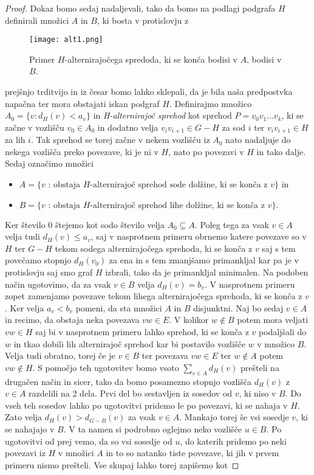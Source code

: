 \documentclass[12pt,a4paper,twoside]{article}
\theoremstyle{definition} %
\theoremstyle{plain} %
\numberwithin{equation}{section}  %
\begin{document}
\begin{proof}
Dokaz bomo sedaj nadaljevali, tako da bomo na podlagi podgrafa $H$ definirali množici $A$ in $B$, ki bosta v protislovju z  \begin{figure}[h!]
\caption{Primer $H$-alternirajočega spredoda, ki se konča bodisi v $A$, bodisi v $B$.}
\label{im1}
\centering
    \texttt{[image: alt1.png]}
    \end{figure}prejšnjo trditvijo in iz česar bomo lahko sklepali, da je bila naša predpostvka napačna ter mora obstajati iskan podgraf $H$. 
Definirajmo množico $A_0 = \{v : d_H(v) < a_v\}$ in \textit{H-alternirajoč sprehod} kot sprehod $P = v_0v_1\ldots v_k$, ki se začne v vozlišču $v_0 \in A_0$ in dodatno velja $v_iv_{i+1} \in G-H$ za sod $i$ ter $v_iv_{i+1} \in H$ za lih $i$. Tak sprehod se torej začne v nekem vozlišču iz $A_0$ nato nadaljuje do nekega vozlišča preko povezave, ki je ni v $H$, nato po povezavi v $H$ in tako dalje. Sedaj označimo množici
\begin{itemize}
\item $A = \{v \text{ : obstaja $H$-alternirajoč sprehod sode dolžine, ki se konča z $v$}\}$ in
\item $B =\{v \text{ : obstaja $H$-alternirajoč sprehod lihe dolžine, ki se konča z $v$}\}.$
\end{itemize}
Ker število $0$ štejemo kot sodo število velja $A_0 \subseteq A$. Poleg tega za vsak $v \in A$ velja tudi $d_H(v) \le a_v$, saj v nasprotnem primeru obrnemo katere povezave so v $H$ ter $G-H$ tekom sodega alternirajočega sprehoda, ki se konča z $v$ saj s tem povečamo stopnjo $d_H(v_0)$ za ena in s tem zmanjšamo primankljal kar pa je v protislovju saj smo graf $H$ izbrali, tako da je primankljal minimalen. Na podoben način ugotovimo, da za vsak $v \in B$ velja $d_H(v) = b_v$. V nasprotnem primeru zopet zamenjamo povezave tekom lihega alternirajočega sprehoda, ki se konča z $v$. Ker velja $a_v < b_v$ pomeni, da sta množici $A$ in $B$ disjunktni. Naj bo sedaj $v \in A$ in recimo, da obstaja neka povezava $vw \in E$. V kolikor $w \notin B$ potem mora veljati $vw \in H$ saj bi v nasprotnem primeru lahko sprehod, ki se konča z $v$ podaljšali do $w$ in tkao dobili lih alternirajoč sprehod kar bi postavilo vozlišče $w$ v množico $B$. Velja tudi obratno, torej če je $v \in B$ ter povezava $vw \in  E$ ter $w \notin A$ potem $vw \notin H$. S pomočjo teh ugotovitev bomo vsoto $\sum_{v \in A} d_H(v)$ prešteli na drugačen način in sicer, tako da bomo posamezno stopnjo vozlišča $d_H(v)$ z $v \in  A$ razdelili na 2 dela. Prvi del bo sestavljen iz sosedov od $v$, ki niso v $B$. Do vseh teh sosedov lahko po ugotovitvi pridemo le po povezavi, ki se nahaja v $H$. Zato velja $d_H(v) > d_{G-B}(v)$ za vsak $v \in A$. Mankajo torej še vsi sosedje $v$, ki se nahajajo v $B$. V ta namen si podrobno oglejmo neko vozlišče $u \in B$. Po ugotovitvi od prej vemo, da so vsi sosedje od $u$, do katerih pridemo po neki povezavi iz $H$ v množici $A$ in to so natanko tiste povezave, ki jih v prvem primeru nismo prešteli. Vse skupaj lahko torej zapišemo kot

\end{proof}
\end{document}
